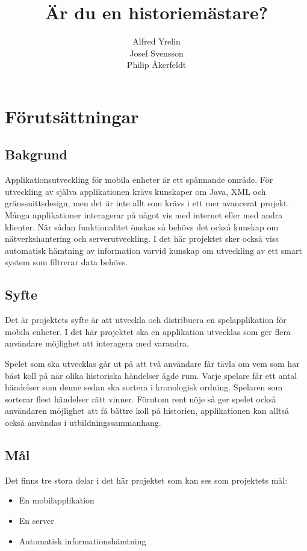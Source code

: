 \documentclass[12pt,a4paper]{article}
\author{Alfred Yrelin\\Josef Svensson\\Philip Åkerfeldt}
\title{Är du en historiemästare?}
\begin{document}
\maketitle
\begin{abstract}

\end{abstract}
\pagebreak
\section{Förutsättningar}
\subsection{Bakgrund}
Applikationsutveckling för mobila enheter är ett spännande område. För utveckling av själva applikationen krävs kunskaper om Java, XML och gränssnittsdesign, men det är inte allt som krävs i ett mer avancerat projekt. Många applikationer interagerar på något vis med internet eller med andra klienter. När sådan funktionalitet önskas så behövs det också kunskap om nätverkshantering och serverutveckling. I det här projektet sker också viss automatisk hämtning av information varvid kunskap om utveckling av ett smart system som filtrerar data behövs.
\subsection{Syfte}
Det är projektets syfte är att utveckla och distribuera en spelapplikation för mobila enheter. I det här projektet ska en applikation utvecklas som ger flera användare möjlighet att interagera med varandra.

Spelet som ska utvecklas går ut på att två användare får tävla om vem som har bäst koll på när olika historiska händelser ägde rum. Varje spelare får ett antal händelser som denne sedan ska sortera i kronologisk ordning. Spelaren som sorterar flest händelser rätt vinner. Förutom rent nöje så ger spelet också användaren möjlighet att få bättre koll på historien, applikationen kan alltså också användas i utbildningssammanhang.
\subsection{Mål}
Det finns tre stora delar i det här projektet som kan ses som projektets mål:
\begin{itemize}
\item En mobilapplikation
\item En server
\item Automatisk informationshämtning
\end{itemize}
\end{document}

